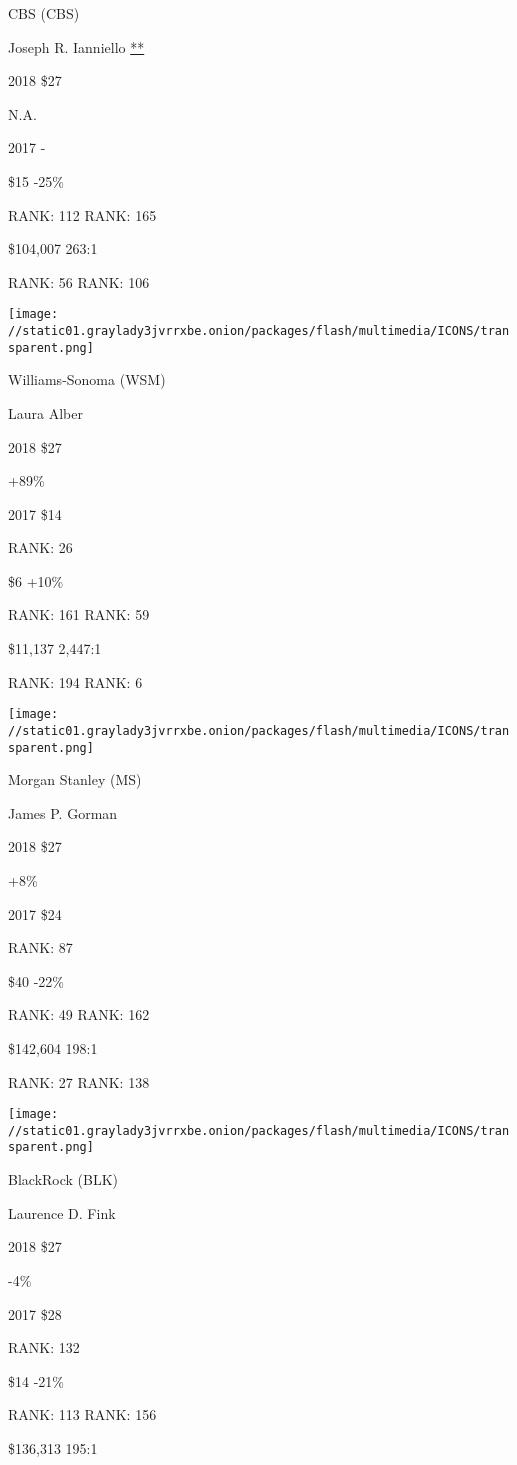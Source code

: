 CBS (CBS)

Joseph R. Ianniello \protect\hyperlink{g-footnotes}{**}

2018 \$27

 N.A.

2017 -

 \$15 -25\%

RANK: 112 RANK: 165

 \$104,007 263:1

RANK: 56 RANK: 106

\texttt{[image: //static01.graylady3jvrrxbe.onion/packages/flash/multimedia/ICONS/transparent.png]}

Williams-Sonoma (WSM)

Laura Alber \protect\hyperlink{g-footnotes}{}

2018 \$27

 +89\%

2017 \$14

RANK: 26

 \$6 +10\%

RANK: 161 RANK: 59

 \$11,137 2,447:1

RANK: 194 RANK: 6

\texttt{[image: //static01.graylady3jvrrxbe.onion/packages/flash/multimedia/ICONS/transparent.png]}

Morgan Stanley (MS)

James P. Gorman \protect\hyperlink{g-footnotes}{}

2018 \$27

 +8\%

2017 \$24

RANK: 87

 \$40 -22\%

RANK: 49 RANK: 162

 \$142,604 198:1

RANK: 27 RANK: 138

\texttt{[image: //static01.graylady3jvrrxbe.onion/packages/flash/multimedia/ICONS/transparent.png]}

BlackRock (BLK)

Laurence D. Fink \protect\hyperlink{g-footnotes}{}

2018 \$27

 -4\%

2017 \$28

RANK: 132

 \$14 -21\%

RANK: 113 RANK: 156

 \$136,313 195:1

